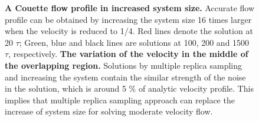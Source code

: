 \documentclass[preprint,12pt]{elsarticle}
\begin{document}
\begin{figure}
\centering
{}
\hskip 1cm
\vskip-0.2cm
\caption[]{\small {} {\bf A Couette flow profile in increased system size.} 
Accurate flow profile can be obtained by increasing the system size 
16 times larger when the velocity is reduced to 1/4. Red lines denote 
the solution at 20 $\tau$; Green, blue and black lines are solutions 
at 100, 200 and 1500 $\tau$, respectively. 
 {\bf The variation of the velocity in the middle of 
the overlapping region.} Solutions by multiple replica sampling 
and increasing the system contain the similar strength of the noise 
in the solution, which is around 5 $\%$ of analytic velocity profile. 
This implies that multiple replica sampling approach can replace 
the increase of system size for solving moderate velocity flow.}
\label{increase_system}
\end{figure}
\end{document}
